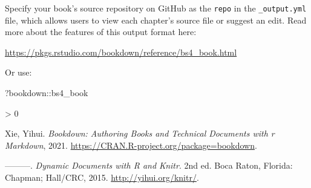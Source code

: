 \documentclass[
]{book}
\newenvironment{Shaded}{\begin{snugshade}}{\end{snugshade}}
\newcommand{\NormalTok}[1]{#1}
\newcommand{\SpecialCharTok}[1]{\textcolor[rgb]{0.00,0.00,0.00}{#1}}
\newlength{\cslhangindent}
\newenvironment{CSLReferences}[2] %
 {%
  \setlength{\parindent}{0pt}
  \ifodd #1 \everypar{\setlength{\hangindent}{\cslhangindent}}\ignorespaces\fi
  \ifnum #2 > 0
  \setlength{\parskip}{#2\baselineskip}
  \fi
 }%
 {}
\theoremstyle{definition}
\theoremstyle{definition}
\theoremstyle{definition}
\theoremstyle{definition}
\theoremstyle{remark}
\begin{document}
Specify your book's source repository on GitHub as the \texttt{repo} in the \texttt{\_output.yml} file, which allows users to view each chapter's source file or suggest an edit. Read more about the features of this output format here:

\url{https://pkgs.rstudio.com/bookdown/reference/bs4_book.html}

Or use:

\begin{Shaded}
\begin{Highlighting}[]
\NormalTok{?bookdown}\SpecialCharTok{::}\NormalTok{bs4\_book}
\end{Highlighting}
\end{Shaded}

\hypertarget{refs}{}
\begin{CSLReferences}{1}{0}
\leavevmode\hypertarget{ref-R-bookdown}{}%
Xie, Yihui. \emph{Bookdown: Authoring Books and Technical Documents with r Markdown}, 2021. \url{https://CRAN.R-project.org/package=bookdown}.

\leavevmode\hypertarget{ref-xie2015}{}%
---------. \emph{Dynamic Documents with {R} and Knitr}. 2nd ed. Boca Raton, Florida: Chapman; Hall/CRC, 2015. \url{http://yihui.org/knitr/}.

\end{CSLReferences}
\end{document}
